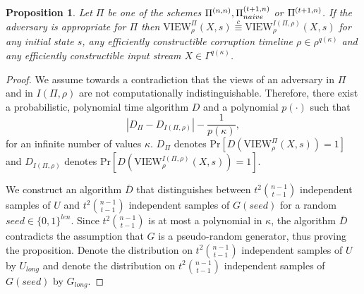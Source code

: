 \documentclass[letterpaper,11pt]{article}
\newcommand{\abs}[1]{\left| #1\right|}
\newcommand{\nnPi}{{\rm {\Pi}}^{(n,n)}}
\newcommand{\tnPiNaive}{{\rm {\Pi}}^{(t+1,n)}_{naive}}
\newcommand{\tnPi}{{\rm {\Pi}}^{(t+1,n)}}
\newtheorem{proposition}[theorem]{Proposition}
\begin{document}
\begin{proposition}
\label{prop:indis_pi_int}
Let $\Pi$ be one of the schemes $\nnPi, \tnPiNaive$ or $\tnPi$. If the adversary is appropriate for $\Pi$ then $\mbox{VIEW}_{\rho}^{\Pi}(X, s) \stackrel{c}{\equiv} \mbox{VIEW}_{\rho}^{I(\Pi,\rho)}(X, s)$ for  any initial state $s$, any efficiently constructible corruption timeline $\rho \in \rho^{q(\kappa)}$ and any efficiently constructible input stream $X \in \Gamma^{q(\kappa)}$. 
\end{proposition}
\begin{proof}
We assume towards a contradiction that the views of an adversary in $\Pi$ and in $I(\Pi,\rho)$ are not computationally indistinguishable.
Therefore, there exist a probabilistic, polynomial time algorithm $D$ and a polynomial $p(\cdot)$ such that 
$$ \abs{D_{\Pi} - D_{I(\Pi,\rho)}} - \frac{1}{p(\kappa)},$$
for an infinite number of values $\kappa$. $D_{\Pi}$ denotes $\mbox{Pr}[D(\mbox{VIEW}_{\rho}^{\Pi}(X, s))=1]$ and $D_{I(\Pi,\rho)}$ denotes $\mbox{Pr}[D(\mbox{VIEW}_{\rho}^{I(\Pi,\rho)}(X, s))=1]$.


We construct an algorithm $\bar{D}$ that distinguishes between $t^2 {n-1 \choose t-1}$ independent samples of $U$ and $t^2 {n-1 \choose t-1}$ independent samples of $G(seed)$ for a random $seed \in \{0,1\}^{len}$. Since $t^2 {n-1 \choose t-1}$ is at most a polynomial in $\kappa$, the algorithm $\bar{D}$ contradicts the assumption that $G$ is a pseudo-random generator, thus proving the proposition. Denote the distribution on $t^2 {n-1 \choose t-1}$ independent samples of $U$ by $U_{long}$ and denote the distribution on $t^2 {n-1 \choose t-1}$ independent samples of $G(seed)$ by $G_{long}$.


\end{proof}
\end{document}
